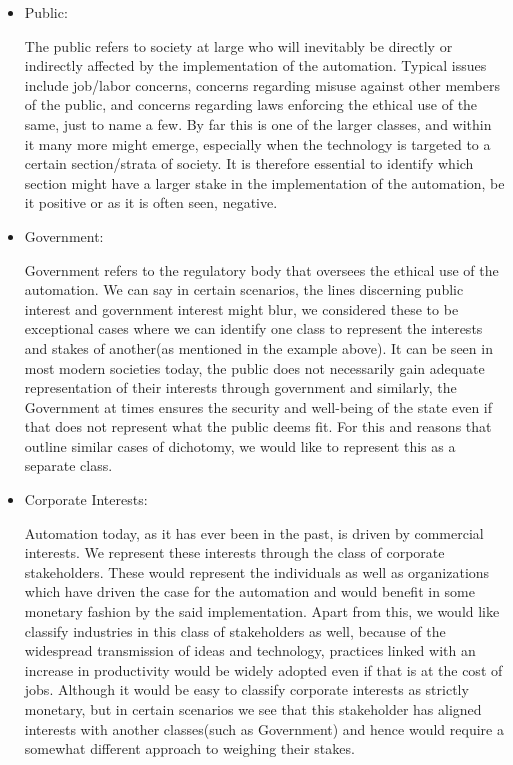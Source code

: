 \begin{itemize}
\item Public:
\begin{pointenv}
The public refers to society at large who will inevitably be directly 
or indirectly affected by the implementation of the automation. Typical 
issues include job/labor concerns, concerns regarding misuse against 
other members of the public, and concerns regarding laws enforcing the 
ethical use of the same, just to name a few. By far this is one of the 
larger classes, and within it many more might emerge, especially when 
the technology is targeted to a certain section/strata of society. It 
is therefore essential to identify which section might have a larger 
stake in the implementation of the automation, be it positive or as it 
is often seen, negative.
\end{pointenv}
\item Government:
\begin{pointenv}
Government refers to the regulatory body that oversees the ethical use of the automation. We can say in certain scenarios, the lines discerning public interest and government interest might blur, we considered these to be exceptional cases where we can identify one class to represent the interests and stakes of another(as mentioned in the example above). It can be seen in most modern societies today, the public does not necessarily gain adequate representation of their interests through government and similarly, the Government at times ensures the security and well-being of the state even if that does not represent what the public deems fit. For this and reasons that outline similar cases of dichotomy, we would like to represent this as a separate class.
\end{pointenv}
\item Corporate Interests:
\begin{pointenv}
Automation today, as it has ever been in the past, is driven by commercial interests. We represent these interests through the class of corporate stakeholders. These would represent the individuals as well as organizations which have driven the case for the automation and would benefit in some monetary fashion by the said implementation. Apart from this, we would like classify industries in this class of stakeholders as well, because of the widespread transmission of ideas and technology, practices linked with an increase in productivity would be widely adopted even if that is at the cost of jobs. Although it would be easy to classify corporate interests as strictly monetary, but in certain scenarios we see that this stakeholder has aligned interests with another classes(such as Government) and hence would require a somewhat different approach to weighing their stakes.
\end{pointenv}
\end{itemize}
